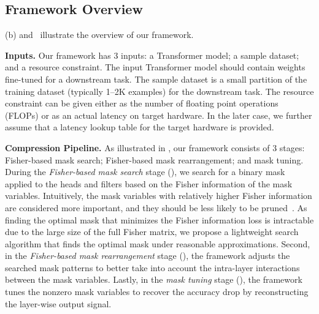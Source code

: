 \vspace{-1mm}
\subsection{Framework Overview}
\label{subsec:overview}

(b) and~ illustrate the overview of our framework.

\textbf{Inputs.}
Our framework has 3 inputs: a Transformer model; a sample dataset; and a resource constraint.
The input Transformer model should contain weights fine-tuned for a downstream task.
The sample dataset is a small partition of the training dataset (typically 1--2K examples) for the downstream task.
The resource constraint can be given either as the number of floating point operations (FLOPs) or as an actual latency on target hardware.
In the later case, we further assume that a latency lookup table for the target hardware is provided.

\textbf{Compression Pipeline.}
As illustrated in ,
our framework consists of 3 stages: Fisher-based mask search; Fisher-based mask rearrangement; and mask tuning.
During the \textit{Fisher-based mask search }stage (), we search for a binary mask applied to the heads and filters based on the Fisher information of the mask variables.
Intuitively, the mask variables with relatively higher Fisher information are considered more important, and they should be less likely to be pruned~\cite{lecun1990optimal,liu2021group,molchanov2019importance}.
As finding the optimal mask that minimizes the Fisher information loss is intractable due to the large size of the full Fisher matrix,
we propose a lightweight search algorithm that finds the optimal mask under reasonable approximations.
Second, in the \textit{Fisher-based mask rearrangement} stage (), the framework adjusts the searched mask patterns to better take into account the intra-layer interactions between the mask variables. 
Lastly, in the \textit{mask tuning} stage (), the framework tunes the nonzero mask variables to recover the accuracy drop by reconstructing the layer-wise output signal.
